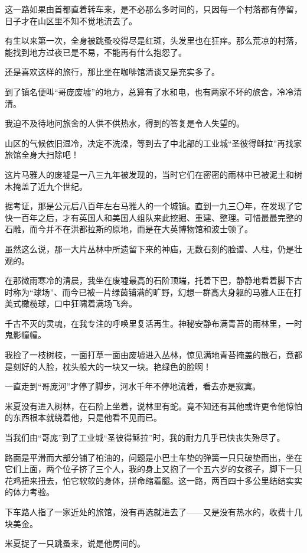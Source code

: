 \par 这一路如果由首都直着转车来，是不必那么多时间的，只因每一个村落都有停留，日子才在山区里不知不觉地流去了。
\par 有生以来第一次，全身被跳蚤咬得尽是红斑，头发里也在狂痒。那么荒凉的村落，能找到地方过夜已是不易，不能再有什么抱怨了。
\par 还是喜欢这样的旅行，那比坐在咖啡馆清谈又是充实多了。
\par 到了镇名便叫“哥庞废墟”的地方，总算有了水和电，也有两家不坏的旅舍，冷冷清清。
\par 我迫不及待地问旅舍的人供不供热水，得到的答复是令人失望的。
\par 山区的气候依旧湿冷，决定不洗澡，等到去了中北部的工业城“圣彼得稣拉”再找家旅馆全身大扫除吧！
\par 这片马雅人的废墟是一八三九年被发现的，当时它们在密密的雨林中已被泥土和树木掩盖了近九个世纪。
\par 据考证，那是公元后八百年左右马雅人的一个城镇。直到一九三〇年，在发现了它快一百年之后，才有英国人和美国人组队来此挖掘、重建、整理。可惜最最完整的石雕，而今并不在洪都拉斯的原地，而是在大英博物馆和波士顿了。
\par 虽然这么说，那一大片丛林中所遗留下来的神庙，无数石刻的脸谱、人柱，仍是壮观的。
\par 在那微雨寒冷的清晨，我坐在废墟最高的石阶顶端，托着下巴，静静地看着脚下古时称为“球场”、而今已被一片绿茵铺满的旷野，幻想一群高大身躯的马雅人正在打美式橄榄球，口中狂啸着满场飞奔。
\par 千古不灭的灵魂，在我专注的呼唤里复活再生。神秘安静布满青苔的雨林里，一时鬼影幢幢。
\par 我捡了一枝树枝，一面打草一面由废墟进入丛林，惊见满地青苔掩盖的散石，竟都是刻好的人脸，枕头般大的一块又一块。艳绿色的脸啊！
\par 一直走到“哥庞河”才停了脚步，河水千年不停地流着，看去亦是寂寞。
\par 米夏没有进入树林，在石阶上坐着，说林里有蛇。竟不知还有其他或许更令他惊怕的东西根本就绕着他，只是他看不见而已。
\par 当我们由“哥庞”到了工业城“圣彼得稣拉”时，我的耐力几乎已快丧失殆尽了。
\par 路面是平滑而大部分铺了柏油的，问题是小巴士车垫的弹簧一只只破垫而出，坐在它们上面，两个位子挤了三个人，我的身上又抱了一个五六岁的女孩子，脚下一只花鸡扭来扭去，怕它软软的身体，拼命缩着腿。这一路，两百四十多公里结结实实的体力考验。
\par 下车路人指了一家近处的旅馆，没有再选就进去了——又是没有热水的，收费十几块美金。
\par 米夏捉了一只跳蚤来，说是他房间的。

